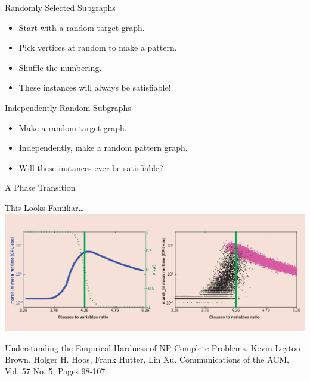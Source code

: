 \documentclass{beamer}
\begin{document}
\begin{frame}{Randomly Selected Subgraphs}

    \begin{itemize}
        \item Start with a random target graph.
        \item Pick vertices at random to make a pattern.
        \item Shuffle the numbering.
        \item <2-> These instances will always be satisfiable!
    \end{itemize}

\end{frame}

\begin{frame}{Independently Random Subgraphs}

    \begin{itemize}
        \item Make a random target graph.
        \item Independently, make a random pattern graph.
        \item <2-> Will these instances ever be satisfiable?
    \end{itemize}

\end{frame}

\begin{frame}[plain,t]{A Phase Transition}




\end{frame}

\begin{frame}{This Looks Familiar\ldots}
    \centering
    \includegraphics*[keepaspectratio=true,scale=0.25]{sat.jpg}

    \par\flushleft
    Understanding the Empirical Hardness of NP-Complete Problems. Kevin Leyton-Brown, Holger H.
    Hoos, Frank Hutter, Lin Xu.  Communications of the ACM, Vol. 57 No. 5, Pages 98-107
\end{frame}
\end{document}
